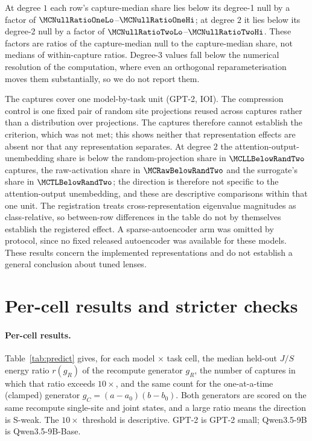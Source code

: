 \noindent At degree $1$ each row's capture-median share lies below its degree-1 null by a factor of
$\MCNullRatioOneLo$--$\MCNullRatioOneHi$; at degree $2$ it lies below its degree-2 null by a factor of
$\MCNullRatioTwoLo$--$\MCNullRatioTwoHi$. These factors are ratios of the capture-median null to the capture-median
share, not medians of within-capture ratios. Degree-3 values fall below the numerical resolution of the computation,
where even an orthogonal reparameterisation moves them substantially, so we do not report them.

The captures cover one model-by-task unit (GPT-2, IOI). The compression control is one fixed pair of random site projections reused across
captures rather than a distribution over projections. The captures therefore cannot establish the criterion, which
was not met; this shows neither that representation effects are absent nor that any representation separates. At degree $2$
the attention-output-unembedding share is below the random-projection share in $\MCLLBelowRandTwo$ captures, the raw-activation share in
$\MCRawBelowRandTwo$ and the surrogate's share in $\MCTLBelowRandTwo$; the direction is therefore not specific to the
attention-output unembedding, and these are descriptive comparisons within that one unit. The registration treats cross-representation
eigenvalue magnitudes as class-relative, so between-row differences in the table do not by themselves establish the
registered effect. A sparse-autoencoder arm was omitted by protocol, since no fixed released autoencoder was available
for these models. These results concern the implemented representations and do not establish a general conclusion
about tuned lenses.

\section{Per-cell results and stricter checks}
\label{app:units}

\paragraph{Per-cell results.} Table~\ref{tab:predict} gives, for each model $\times$ task cell, the median held-out $J/S$
energy ratio $r(g_R)$ of the recompute generator $g_R$, the number of captures in which that ratio exceeds $10\times$,
and the same count for the one-at-a-time (clamped) generator $g_C=(a-a_0)(b-b_0)$. Both generators are scored on the same
recompute single-site and joint states, and a large ratio means the direction is S-weak. The $10\times$ threshold is
descriptive. GPT-2 is GPT-2 small; Qwen3.5-9B is Qwen3.5-9B-Base.

